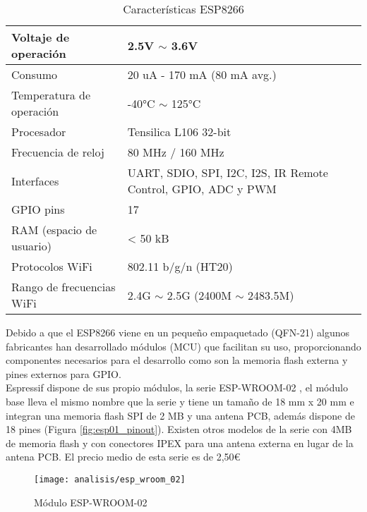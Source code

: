 \documentclass[../proyecto.tex]{subfiles}
\begin{document}
\begin{table}[H]
\centering
\begin{tabular}{ |l|m{20em}| }
\hline
Voltaje de operación      & 2.5V $\sim$ 3.6V          \\ \hline
Consumo                   & 20 uA - 170 mA (80 mA avg.)  \\ \hline
Temperatura de operación  & -40°C $\sim$ 125°C        \\ \hline
Procesador                & Tensilica L106 32-bit     \\ \hline
Frecuencia de reloj       & 80 MHz / 160 MHz          \\ \hline
Interfaces                & UART, SDIO, SPI, I2C, I2S, IR Remote Control, GPIO, ADC y PWM                           \\ \hline
GPIO pins                 & 17                        \\ \hline
RAM (espacio de usuario)  & < 50 kB                     \\ \hline
Protocolos WiFi           & 802.11 b/g/n (HT20)       \\ \hline
Rango de frecuencias WiFi & 2.4G $\sim$ 2.5G (2400M $\sim$ 2483.5M) \\ \hline
\end{tabular}
\caption{Características ESP8266}
\label{table:caracteristicas_esp8266}
\end{table}

Debido a que el ESP8266 viene en un pequeño empaquetado (QFN-21) algunos fabricantes han desarrollado módulos (MCU) que facilitan su uso, proporcionando componentes necesarios para el desarrollo como son la memoria flash externa y pines externos para GPIO.\\

Espressif dispone de sus propio módulos, la serie ESP-WROOM-02 \cite{espwroom02_overview}, el módulo base \cite{espwroom02_datasheet} lleva el mismo nombre que la serie y tiene un tamaño de 18 mm x 20 mm e integran una memoria flash SPI de 2 MB y una antena PCB, además dispone de 18 pines (Figura \ref{fig:esp01_pinout}). Existen otros modelos de la serie con 4MB de memoria flash y con conectores IPEX para una antena externa en lugar de la antena PCB. El precio medio de esta serie es de 2,50€ \cite{espressif_provider_digikey} \cite{espressif_provider_mouser}\\

\begin{figure}[h]
\centering
\texttt{[image: analisis/esp\_wroom\_02]}
\caption{Módulo ESP-WROOM-02}
\label{fig:esp_wrom_02}
\end{figure}
\end{document}
